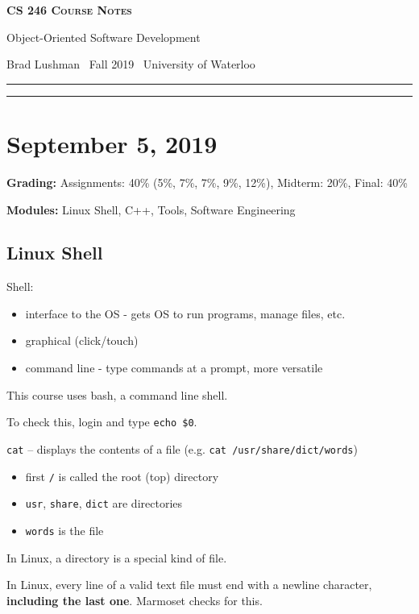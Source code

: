 \documentclass[11pt]{article}
\makeatletter
\theoremstyle{definition}
\newcommand{\newtitle}[4]{
  \begin{center}
	\huge{\textbf{\textsc{#1 Course Notes}}}
    
	\large{\sc #2}
    
	{\sc #3 \textbullet\, #4 \textbullet\, University of Waterloo}
	\normalsize\vspace{1cm}\hrule\vspace{0.5cm}
	
  \end{center}
}
\makeatother
\begin{document}

\newtitle{CS 246}{Object-Oriented Software Development}{Brad Lushman}{Fall 2019}


\tableofcontents
\vspace{1cm}\hrule
\clearpage
{}

\section{September 5, 2019}

{\bf Grading:} Assignments: 40\% (5\%, 7\%, 7\%, 9\%, 12\%), Midterm: 20\%, Final: 40\% 

{\bf Modules:} Linux Shell, C++, Tools, Software Engineering

\subsection{Linux Shell}
Shell: \vspace{-0.25cm}
\begin{itemize}
    \item interface to the OS - gets OS to run programs, manage files, etc.
    \item graphical (click/touch)
    \item command line - type commands at a prompt, more versatile
\end{itemize}
\vspace{-0.25cm} 
This course uses bash, a command line shell.

To check this, login and type {\tt echo \$0}.

{\tt cat} -- displays the contents of a file (e.g. {\tt cat /usr/share/dict/words}) \vspace{-0.25cm}
\begin{itemize}
    \item first {\tt /} is called the root (top) directory
    \item {\tt usr}, {\tt share}, {\tt dict} are directories
    \item {\tt words} is the file
\end{itemize}
\vspace{-0.25cm}
In Linux, a directory is a special kind of file.

In Linux, every line of a valid text file must end with a newline character, {\bf including the last one}. Marmoset checks for this.
\end{document}
